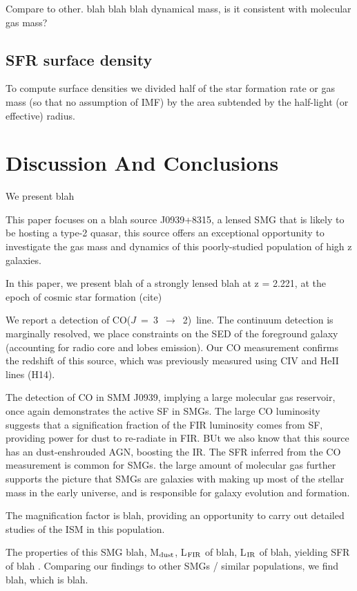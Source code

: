 \documentclass[twocolumn,apj,numberedappendix]{emulateapj}
\newcommand{\CO}{\mbox{CO($J$ = 3 $\rightarrow$ 2) }}
\begin{document}
Compare to other. blah blah blah dynamical mass, is it consistent with molecular gas mass?

\subsection{SFR surface density}
To compute surface densities we divided half of the star formation rate or gas mass (so that no assumption of IMF) by the area subtended by the half-light (or effective) radius.


\section{Discussion And Conclusions} \label{sec:conclusions}
We present blah

This paper focuses on a blah source J0939+8315, a lensed SMG that is likely to be hosting a type-2 quasar, this source offers an exceptional opportunity to
investigate the gas mass and dynamics of this
poorly-studied population of high z galaxies.

In this paper, we present blah of a strongly lensed blah at z = 2.221, at the epoch of cosmic star formation (cite)

We report a detection of \CO line.
The continuum detection is marginally resolved, we place constraints on the SED of the foreground galaxy (accounting for radio 
core and lobes emission). Our CO measurement confirms the redshift of this source, which was previously measured using CIV and HeII lines (H14).

The detection of CO in SMM J0939, implying a large molecular gas reservoir, once again demonstrates the active SF in SMGs. 
The large CO luminosity suggests that a signification fraction of the FIR luminosity comes from SF, providing power for dust to re-radiate in FIR. BUt we also know that this source has an dust-enshrouded AGN, boosting the IR.
The SFR inferred from the CO measurement is common for SMGs. the large amount of molecular gas further supports the picture that SMGs are galaxies with making up most of the stellar mass in the early universe, and is responsible for galaxy evolution and formation. 

The magnification factor is blah, providing an opportunity to carry out detailed studies of the ISM in this population.

The properties of this SMG blah, M$_{\rm dust}$, L$_{\rm FIR}$ of blah, L$_{\rm IR}$ of blah, yielding SFR of 
blah . Comparing our findings to other SMGs / similar populations, we find blah, which is blah.
\end{document}
